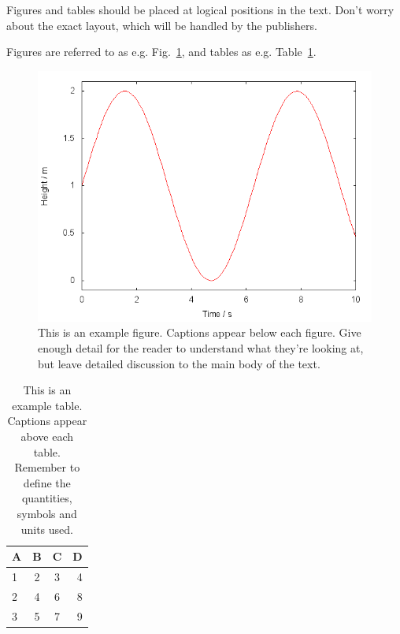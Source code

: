 \documentclass[a4paper,fleqn,usenatbib]{mnras}
\begin{document}
Figures and tables should be placed at logical positions in the text. Don't
worry about the exact layout, which will be handled by the publishers.

Figures are referred to as e.g. Fig.~\ref{fig:example_figure}, and tables as
e.g. Table~\ref{tab:example_table}.

\begin{figure}
	\includegraphics[width=\columnwidth]{example}
    \caption{This is an example figure. Captions appear below each figure.
	Give enough detail for the reader to understand what they're looking at,
	but leave detailed discussion to the main body of the text.}
    \label{fig:example_figure}
\end{figure}

\begin{table}
	\centering
	\caption{This is an example table. Captions appear above each table.
	Remember to define the quantities, symbols and units used.}
	\label{tab:example_table}
	\begin{tabular}{lccr} %
		\hline
		A & B & C & D\\
		\hline
		1 & 2 & 3 & 4\\
		2 & 4 & 6 & 8\\
		3 & 5 & 7 & 9\\
		\hline
	\end{tabular}
\end{table}
\end{document}
